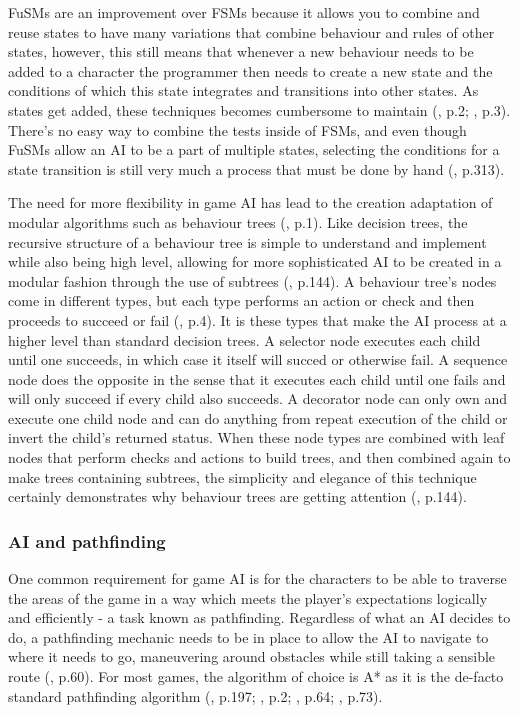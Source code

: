 \documentclass[10pt]{article}
\begin{document}
FuSMs are an improvement over FSMs because it allows you to combine and reuse states to have many variations that combine behaviour and rules of other states, however, this still means that whenever a new behaviour needs to be added to a character the programmer then needs to create a new state and the conditions of which this state integrates and transitions into other states. As states get added, these techniques becomes cumbersome to maintain (\cite{sweetser2002current}, p.2; \cite{lim2010evolving}, p.3). There's no easy way to combine the tests inside of FSMs, and even though FuSMs allow an AI to be a part of multiple states, selecting the conditions for a state transition is still very much a process that must be done by hand (\cite{millington2019ai}, p.313). 

The need for more flexibility in game AI has lead to the creation adaptation of modular algorithms such as behaviour trees (\cite{lim2010evolving}, p.1). Like decision trees, the recursive structure of a behaviour tree is simple to understand and implement while also being high level, allowing for more sophisticated AI to be created in a modular fashion through the use of subtrees (\cite{shoulson2011parameterizing}, p.144). A behaviour tree's nodes come in different types, but each type performs an action or check and then proceeds to succeed or fail (\cite{lim2010evolving}, p.4). It is these types that make the AI process at a higher level than standard decision trees. A selector node executes each child until one succeeds, in which case it itself will succed or otherwise fail. A sequence node does the opposite in the sense that it executes each child until one fails and will only succeed if every child also succeeds. A decorator node can only own and execute one child node and can do anything from repeat execution of the child or invert the child's returned status. When these node types are combined with leaf nodes that perform checks and actions to build trees, and then combined again to make trees containing subtrees, the simplicity and elegance of this technique certainly demonstrates why behaviour trees are getting attention (\cite{shoulson2011parameterizing}, p.144).

\subsubsection{AI and pathfinding}

One common requirement for game AI is for the characters to be able to traverse the areas of the game in a way which meets the player's expectations logically and efficiently - a task known as pathfinding. Regardless of what an AI decides to do, a pathfinding mechanic needs to be in place to allow the AI to navigate to where it needs to go, maneuvering around obstacles while still taking a sensible route (\cite{graham2003pathfinding}, p.60). For most games, the algorithm of choice is A* as it is the de-facto standard pathfinding algorithm (\cite{millington2019ai}, p.197; \cite{botea2004near}, p.2; \cite{nareyek2004ai}, p.64; \cite{leigh2007using}, p.73).
\end{document}
